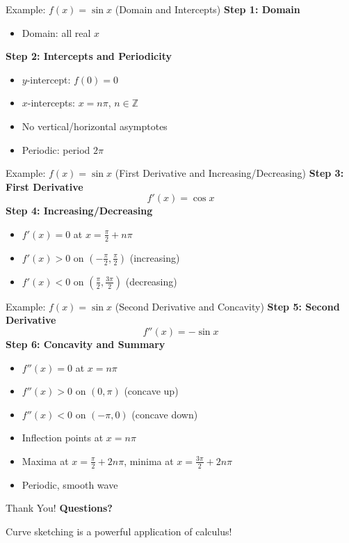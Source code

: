 \documentclass[aspectratio=169]{beamer}
\begin{document}
\begin{frame}{Example: $f(x) = \sin x$ (Domain and Intercepts)}
\textbf{Step 1: Domain}
\begin{itemize}
    \item Domain: all real $x$
\end{itemize}
\textbf{Step 2: Intercepts and Periodicity}
\begin{itemize}
    \item $y$-intercept: $f(0)=0$
    \item $x$-intercepts: $x = n\pi$, $n\in\mathbb{Z}$
    \item No vertical/horizontal asymptotes
    \item Periodic: period $2\pi$
\end{itemize}
\end{frame}

\begin{frame}{Example: $f(x) = \sin x$ (First Derivative and Increasing/Decreasing)}
\textbf{Step 3: First Derivative}
\[
    f'(x) = \cos x
\]
\textbf{Step 4: Increasing/Decreasing}
\begin{itemize}
    \item $f'(x)=0$ at $x=\frac{\pi}{2} + n\pi$
    \item $f'(x)>0$ on $(-\frac{\pi}{2}, \frac{\pi}{2})$ (increasing)
    \item $f'(x)<0$ on $(\frac{\pi}{2}, \frac{3\pi}{2})$ (decreasing)
\end{itemize}
\end{frame}

\begin{frame}{Example: $f(x) = \sin x$ (Second Derivative and Concavity)}
\textbf{Step 5: Second Derivative}
\[
    f''(x) = -\sin x
\]
\textbf{Step 6: Concavity and Summary}
\begin{itemize}
    \item $f''(x)=0$ at $x=n\pi$
    \item $f''(x)>0$ on $(0,\pi)$ (concave up)
    \item $f''(x)<0$ on $(-\pi,0)$ (concave down)
    \item Inflection points at $x=n\pi$
    \item Maxima at $x=\frac{\pi}{2}+2n\pi$, minima at $x=\frac{3\pi}{2}+2n\pi$
    \item Periodic, smooth wave
\end{itemize}
\end{frame}

\begin{frame}{Thank You!}
\centering
\vspace{2cm}
{\Huge \textcolor{myblue}{\textbf{Questions?}}}

\vspace{1cm}
{\Large Curve sketching is a powerful application of calculus!}
\end{frame}
\end{document}
